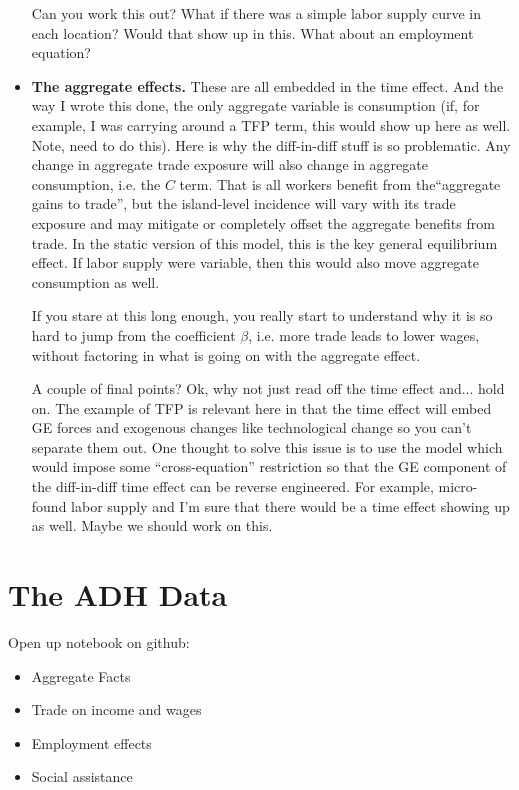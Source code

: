 \documentclass[pdftex,12pt]{article}
\begin{document}
\begin{itemize}
    Can you work this out? What if there was a simple labor supply curve in each location? Would that show up in this. What about an employment equation?

\item \textbf{The aggregate effects.} These are all embedded in the time effect. And the way I wrote this done, the only aggregate variable is consumption (if, for example, I was carrying around a TFP term, this would show up here as well. Note, need to do this). Here is why the diff-in-diff stuff is so problematic.  Any change in aggregate trade exposure will also change in aggregate consumption, i.e. the $C$ term. That is all workers benefit from the``aggregate gains to trade'', but the island-level incidence will vary with its trade exposure and may mitigate or completely offset the aggregate benefits from trade. In the static version of this model, this is the key general equilibrium effect. If labor supply were variable, then this would also move aggregate consumption as well. 

    If you stare at this long enough, you really start to understand why it is so hard to jump from the coefficient $\beta$, i.e. more trade leads to lower wages, without factoring in what is going on with the aggregate effect.

    A couple of final points? Ok, why not just read off the time effect and... hold on. The example of TFP is relevant here in that the time effect will embed GE forces and exogenous changes like technological change so you can't separate them out. One thought to solve this issue is to use the model which would impose some ``cross-equation'' restriction so that the GE component of the diff-in-diff time effect can be reverse engineered. For example, micro-found labor supply and I'm sure that there would be a time effect showing up as well. Maybe we should work on this. 
\end{itemize}



\newpage

\section{The ADH Data}

Open up notebook on github:

\begin{itemize}
\item Aggregate Facts

\item Trade on income and wages

\item Employment effects

\item Social assistance
\end{itemize}
\end{document}
